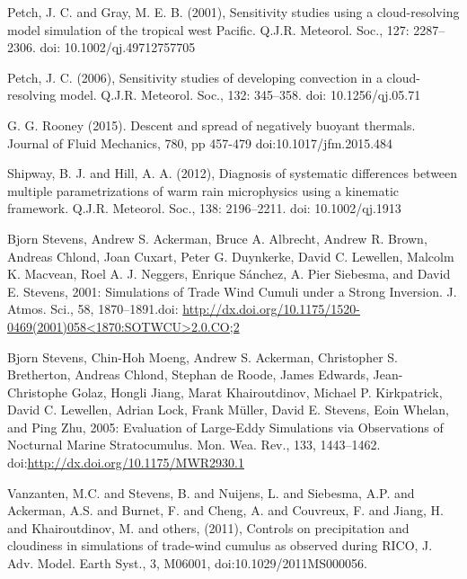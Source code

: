 \documentclass[a4paper,11pt]{article}
\begin{document}
\begin{thebibliography}{}
\item{Petch, J. C. and Gray, M. E. B. (2001), Sensitivity studies using a cloud-resolving model simulation of the tropical west Pacific. Q.J.R. Meteorol. Soc., 127: 2287–2306. doi: 10.1002/qj.49712757705}

\item{Petch, J. C. (2006), Sensitivity studies of developing convection in a cloud-resolving model. Q.J.R. Meteorol. Soc., 132: 345–358. doi: 10.1256/qj.05.71}

\item{ G. G. Rooney (2015). Descent and spread of negatively buoyant thermals. Journal of Fluid Mechanics,
    780, pp 457-479 doi:10.1017/jfm.2015.484}

\item{Shipway, B. J. and Hill, A. A. (2012), Diagnosis of systematic differences between multiple parametrizations of warm rain microphysics using a kinematic framework. Q.J.R. Meteorol. Soc., 138: 2196–2211. doi: 10.1002/qj.1913}

\item{Bjorn Stevens, Andrew S. Ackerman, Bruce A. Albrecht, Andrew R. Brown, Andreas Chlond, Joan Cuxart,
    Peter G. Duynkerke, David C. Lewellen, Malcolm K. Macvean, Roel A. J. Neggers, Enrique Sánchez, A.
    Pier Siebesma, and David E. Stevens, 2001: Simulations of Trade Wind Cumuli under a Strong Inversion.
    J. Atmos. Sci., 58, 1870–1891.doi: \url{http://dx.doi.org/10.1175/1520-0469(2001)058<1870:SOTWCU>2.0.CO;2}}

\item{Bjorn Stevens, Chin-Hoh Moeng, Andrew S. Ackerman, Christopher S. Bretherton, Andreas Chlond, Stephan de Roode,
    James Edwards, Jean-Christophe Golaz, Hongli Jiang, Marat Khairoutdinov, Michael P. Kirkpatrick, David C. Lewellen,
    Adrian Lock, Frank Müller, David E. Stevens, Eoin Whelan, and Ping Zhu, 2005:
    Evaluation of Large-Eddy Simulations via Observations of Nocturnal Marine Stratocumulus. Mon. Wea. Rev., 133, 1443–1462.
    doi:\url{http://dx.doi.org/10.1175/MWR2930.1}}

\item{Vanzanten, M.C. and Stevens, B. and Nuijens, L. and Siebesma, A.P. and Ackerman, A.S. and Burnet, F. and Cheng, A. and Couvreux, F. and Jiang, H. and Khairoutdinov, M. and others, (2011), Controls on precipitation and cloudiness in simulations of trade-wind cumulus as observed during RICO, J. Adv. Model. Earth Syst., 3, M06001, doi:10.1029/2011MS000056.}
\end{thebibliography}
\end{document}

